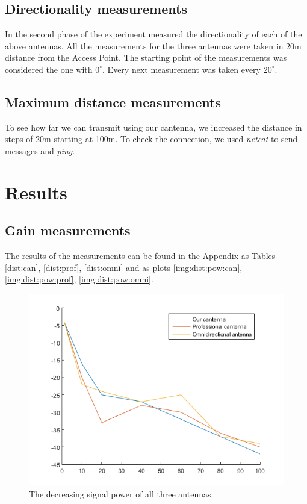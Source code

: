 \documentclass[12pt,a4paper]{article}
\begin{document}
		\subsection{Directionality measurements}
			In the second phase of the experiment measured the directionality of each of the above antennas. All the measurements for the three antennas were taken in $20$m distance from the Access Point. The starting point of the measurements was considered the one with $0^{\circ}$. Every next measurement was taken every $20^{\circ}$.

		\subsection{Maximum distance measurements}
			To see how far we can transmit using our cantenna, we increased the distance in steps of 20m starting at 100m. To check the connection, we used \emph{netcat} to send messages and \emph{ping}.
		
\section{Results}
 
	\subsection{Gain measurements}
		
		The results of the measurements can be found in the Appendix as Tables \autoref{dist:can}, \autoref{dist:prof}, \autoref{dist:omni} and as plots \autoref{img:dist:pow:can}, \autoref{img:dist:pow:prof}, \autoref{img:dist:pow:omni}.
		
		
	
		\begin{figure}
			\includegraphics[width=\textwidth]{plots/all_power.png}
			\caption{The decreasing signal power of all three antennas.}
			\label{all:power}
		\end{figure}
\end{document}
